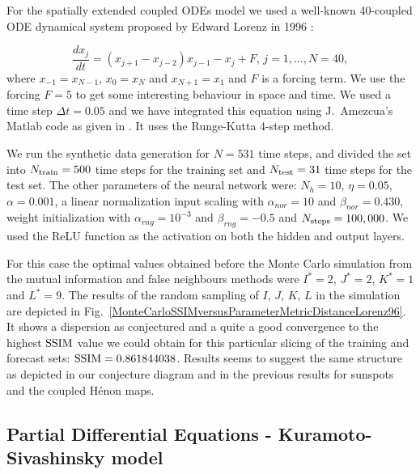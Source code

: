 \documentclass[journal]{IEEEtran}
\begin{document}
For the spatially extended coupled ODEs model we used a well-known 40-coupled ODE dynamical system proposed by Edward Lorenz in 1996 
\cite{articleLorenz96}:

\begin{equation}
\label{lorenz96equations}
\frac{dx_j}{dt}=\left( x_{j+1} - x_{j-2} \right ) x_{j-1} - x_j + F, \, j=1,\ldots,N=40,
\end{equation}
where $x_{-1}=x_{N-1}$, $x_0=x_N$ and $x_{N+1}=x_1$ and $F$ is a forcing term. 
We use the forcing $F=5$ to get some interesting behaviour in space and time. We used a time step $\Delta t=0.05$ and 
we have integrated this equation using J.\ Amezcua's Matlab code as given in \cite{BibEntry2018Apr}. It uses the 
Runge-Kutta 4-step method.



We run the synthetic data generation for $N=531$ time steps, and divided the set into $N_{\textnormal{train}}=500$ time steps for the training set
and $N_{\textnormal{test}}=31$ time steps for the test set. The other parameters of the neural network were:
$N_h=10$, $\eta=0.05$, $\alpha=0.001$, a linear normalization input scaling with $\alpha_{nor} = 10$ and $\beta_{nor} = 0.430$, 
weight initialization with $\alpha_{rng} = 10^{-3}$ and $\beta_{rng} = -0.5$ and $N_{\textnormal{steps}}=100,000$. 
We used the ReLU function as the activation on both the hidden and output layers.

For this case the optimal values obtained before the Monte Carlo simulation from the mutual information and false neighbours methods 
were $I^*=2$, $J^*=2$, $K^*=1$ and $L^*=9$. The results of the random sampling of $I$, $J$, $K$, $L$ in the simulation
are depicted in Fig.\ \ref{MonteCarloSSIMversusParameterMetricDistanceLorenz96}.  It shows a dispersion as conjectured and a quite a good
convergence to the highest 
$\textnormal{SSIM}$ value we could obtain for this particular slicing of the training and forecast sets: $\textnormal{SSIM}=
0.861844038$. Results seems to suggest the same structure as depicted in our conjecture diagram and in the previous results for sunspots
and the coupled H\'{e}non maps.

\subsection{Partial Differential Equations - Kuramoto-Sivashinsky model}
\end{document}
